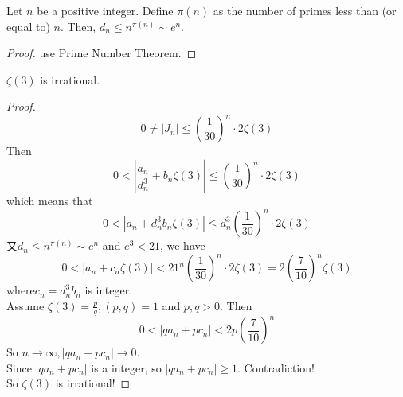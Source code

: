 \begin{lemma}\label{dn_asymptotic}
    Let $n$ be a positive integer. Define $\pi(n)$ as the number of primes less than (or equal to) $n$. Then, $d_n \leqslant n^{\pi(n)} \sim e^n$.
\end{lemma}
\begin{proof}
    use Prime Number Theorem. 
\end{proof}

\begin{theorem}\label{zeta_3_irrational}
    $\zeta(3)$ is irrational.
\end{theorem}
\begin{proof}
    \leanok
    \[ 0 \neq |J_n| \leqslant (\frac{1}{30})^n\cdot 2\zeta(3) \]
    Then 
    \[ 0 < |\frac{a_n}{d_n^3} + b_n\zeta(3)| \leqslant (\frac{1}{30})^n\cdot 2\zeta(3) \]
    which means that 
    \[ 0 < |a_n + d_n^3 b_n\zeta(3)| \leqslant d_n^3(\frac{1}{30})^n\cdot 2\zeta(3) \] 
    又$d_n \leqslant n^{\pi(n)} \sim e^n$ and $e^3 < 21$, we have
    \[ 0 < |a_n + c_n\zeta(3)| < 21^n (\frac{1}{30})^n\cdot 2\zeta(3) = 2(\frac{7}{10})^n \zeta(3) \]
    where$c_n = d_n^3 b_n$ is integer.\\
    Assume $\zeta(3) = \frac{p}{q}, (p,q)=1$ and $p,q>0$. Then 
    \[ 0 < |qa_n + pc_n| < 2p (\frac{7}{10})^n \]
    So $n \rightarrow \infty, |qa_n + pc_n| \rightarrow 0$.\\
    Since $|qa_n + pc_n|$ is a integer, so $|qa_n + pc_n| \geqslant 1$. Contradiction! \\
    So $\zeta(3)$ is irrational!
\end{proof}